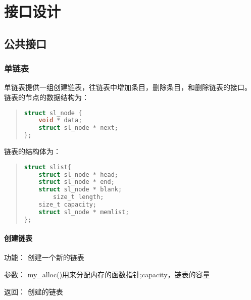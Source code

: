 %
%
\section{接口设计}
\subsection{公共接口}
\subsubsection{单链表}
单链表提供一组创建链表，往链表中增加条目，删除条目，和删除链表的接口。
链表的节点的数据结构为：

\begin{quote}
\begin{lstlisting}[language={C}]
struct sl_node {
	void * data;
	struct sl_node * next;
};
\end{lstlisting}
\end{quote}

链表的结构体为：
\begin{quote}
\begin{lstlisting}[language={C}]
struct slist{
	struct sl_node * head;
	struct sl_node * end;
	struct sl_node * blank;
        size_t length;
	size_t capacity;
	struct sl_node * memlist; 
};
\end{lstlisting}
\end{quote}

\paragraph{创建链表}
	\begin{compactdesc}
	\item[功能：]创建一个新的链表
	\item[参数：]my\_alloc()用来分配内存的函数指针;capacity，链表的容量
	\item[返回：]创建的链表
	\end{compactdesc}
